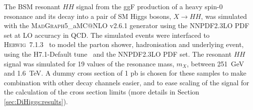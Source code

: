 The BSM resonant $HH$ signal from the ggF production of a heavy spin-0 resonance
and its decay into a pair of SM Higgs bosons, $X \rightarrow HH$, was simulated with the 
\textsc{MadGraph}5\_aMC@NLO v2.6.1 generator using the \textsc{NNPDF2.3LO} PDF
set at LO accuracy in QCD.
The simulated events were interfaced to \textsc{Herwig~7.1.3}~\cite{Bahr:2008pv,Bellm:2015jjp}
to model the parton shower, hadronisation and underlying event, 
using the H7.1-Default tune~\cite{Gieseke:2012ft}
and the \textsc{NNPDF2.3LO} PDF set.
The resonant $HH$ signal was simulated for 19 values of the resonance mass, $m_{X}$,
between 251~GeV and 1.6~TeV.
A dummy cross section of 1 pb is chosen for these samples 
to make combination with other decay channels easier, 
and to ease scaling of the signal 
for the calculation of the cross section limits 
(more details in Section \ref{sec:DiHiggs:results}).

